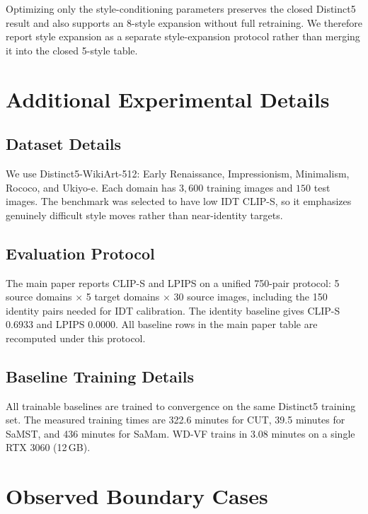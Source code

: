 \documentclass[10pt,letterpaper]{article}
\begin{document}
Optimizing only the style-conditioning parameters preserves the closed Distinct5 result and also supports an 8-style expansion without full retraining. We therefore report style expansion as a separate style-expansion protocol rather than merging it into the closed 5-style table.

\section{Additional Experimental Details}
\label{sec:exp_details}

\subsection{Dataset Details}
\label{sec:dataset}

We use Distinct5-WikiArt-512: Early Renaissance, Impressionism, Minimalism, Rococo, and Ukiyo-e. Each domain has $3{,}600$ training images and $150$ test images. The benchmark was selected to have low IDT CLIP-S, so it emphasizes genuinely difficult style moves rather than near-identity targets.

\subsection{Evaluation Protocol}
\label{sec:eval}

The main paper reports CLIP-S and LPIPS on a unified 750-pair protocol: 5 source domains $\times$ 5 target domains $\times$ 30 source images, including the 150 identity pairs needed for IDT calibration. The identity baseline gives CLIP-S $0.6933$ and LPIPS $0.0000$. All baseline rows in the main paper table are recomputed under this protocol.

\subsection{Baseline Training Details}
\label{sec:baselines}

All trainable baselines are trained to convergence on the same Distinct5 training set. The measured training times are 322.6 minutes for CUT, 39.5 minutes for SaMST, and 436 minutes for SaMam. WD-VF trains in 3.08 minutes on a single RTX 3060 (12\,GB).

\section{Observed Boundary Cases}
\label{sec:failures}
\end{document}
